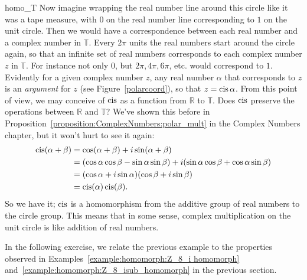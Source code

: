 \begin{example}{homo_T}
\noindent
Now imagine wrapping the real number line around this circle like it was a tape measure, with $0$ on the real number line corresponding to $1$ on the unit circle.  Then we would have a correspondence between each real number and a complex number in ${ \mathbb T}$. Every $2\pi$ units the real numbers start around the circle again, so that an infinite set of real numbers corresponds to each complex number $z$ in ${ \mathbb T}$.  For instance not only 0, but $2\pi, 4\pi, 6\pi$, etc. would correspond to $1$.  
Evidently for a given complex number $z$, any real number $\alpha$ that corresponds to $z$ is an \emph{argument} for $z$ (see Figure~\ref{polarcoord}), so that $z = \operatorname{cis} \alpha$.
From this point of view, we may conceive of $\operatorname{cis}$ as  a function from ${ \mathbb R}$ to  ${ \mathbb T}$.   Does $\operatorname{cis}$ preserve the operations between ${ \mathbb R}$ and ${ \mathbb T}$? We've shown this before in Proposition~\ref{proposition:ComplexNumbers:polar_mult} in the Complex Numbers chapter, but it won't hurt to see it again:
\begin{align*}
\operatorname{cis}( \alpha + \beta )
& =
\cos( \alpha + \beta ) + i \sin( \alpha + \beta ) \\
& =
(\cos \alpha \cos \beta - \sin \alpha \sin \beta)  + i( \sin \alpha 
\cos \beta + \cos \alpha \sin \beta ) \\
& =
(\cos \alpha + i \sin \alpha )(\cos \beta + i \sin \beta
) \\
& = \operatorname{cis}( \alpha ) \operatorname{cis}( \beta ).
\end{align*}
So we have it; $\operatorname{cis}$ is a homomorphism from the additive group of real numbers to the circle group.
This means that in some sense, complex multiplication on the unit circle is like addition of real numbers.
\end{example}


In the following exercise, we relate the previous example to the properties observed in  Examples~\ref{example:homomorph:Z_8_i homomorph} and~\ref{example:homomorph:Z_8_isub_homomorph} in the previous section.


